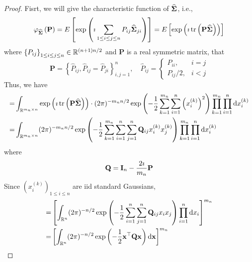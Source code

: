 \begin{proof}
	Fisrt, we will give the characteristic function of $\widehat{\boldsymbol{\Sigma}}$, i.e.,
	\begin{equation*}
		\varphi_{\widehat{\boldsymbol{\Sigma}}}\left(\mathbf{P}\right)=E\left[\exp\left(\imath\sum_{1\leq i\leq j\leq n}P_{ij}\widehat{\boldsymbol{\Sigma}}_{ji}\right)\right]=E\left[\exp\left(\imath\operatorname{tr}\left(\mathbf{P}\widehat{\boldsymbol{\Sigma}}\right)\right)\right]
	\end{equation*}
	where $\left\{P_{ij}\right\}_{1\leq i\leq j\leq n}\in{\mathbb R}^{(n+1)n/2}$ and $\mathbf{P}$ is a real symmetric matrix, that
	\begin{equation*}
		\mathbf{P}=\left\{\widehat{P}_{ij},\widehat{P}_{ij}=\widehat{P}_{ji}\right\}_{i,j=1}^{n},\quad\widehat{P}_{ij}=\begin{cases}P_{ii}, & i=j \\ P_{ij} / 2, & i<j \end{cases}
	\end{equation*}
	Thus, we have
	\begin{equation*}
		\begin{aligned}
			= & \int_{{\mathbb R}^{m_{n}\times n}}\exp\left(\imath\operatorname{tr}\left(\mathbf{P}\widehat{\boldsymbol{\Sigma}}\right)\right)\cdot(2\pi)^{-m_{n}n/2}\exp\left(-\frac{1}{2}\sum_{k=1}^{m_{n}}\sum_{i=1}^{n}\left(x_{i}^{(k)}\right)^{2}\right)\prod_{k=1}^{m_{n}}\prod_{i=1}^{n}\mathop{}\!\mathrm{d} x_{i}^{(k)} \\
			= & \int_{{\mathbb R}^{m_{n}\times n}}(2\pi)^{-m_{n}n/2}\exp\left(-\frac{1}{2}\sum_{k=1}^{m_{n}}\sum_{i=1}^{n}\sum_{j=1}^{n}{\bf Q}_{ij}x_{i}^{(k)}x_{j}^{(k)}\right)\prod_{k=1}^{m_{n}}\prod_{i=1}^{n}\mathop{}\!\mathrm{d} x_{i}^{(k)}
		\end{aligned}
	\end{equation*}
	where
	\begin{equation*}
		{\bf Q}=\mathbf{I}_{n}-\frac{2\imath}{m_{n}}\mathbf{P}
	\end{equation*}
	Since $\left(x_{i}^{(k)}\right)_{1\leq i\leq n}$ are iid standard Gaussians,
	\begin{equation*}
		\begin{aligned}
			= & \left[\int_{\bbR^{n}}(2\pi)^{-n/2}\exp\left(-\frac{1}{2}\sum_{i=1}^{n}\sum_{j=1}^{n}\bfQ_{ij}x_{i}x_{j}\right)\prod_{i=1}^{n}\dif x_{i}\right]^{m_{n}}                                                                                    \\
			= & \left[\int_{\bbR^{n}}(2\pi)^{-n/2}\exp\left(-\frac{1}{2}\bfx^{\top}\bfQ\bfx\right)\dif\bfx\right]^{m_{n}}                                                                                                                                 \\

\end{aligned}
\end{equation*}
\end{proof}
